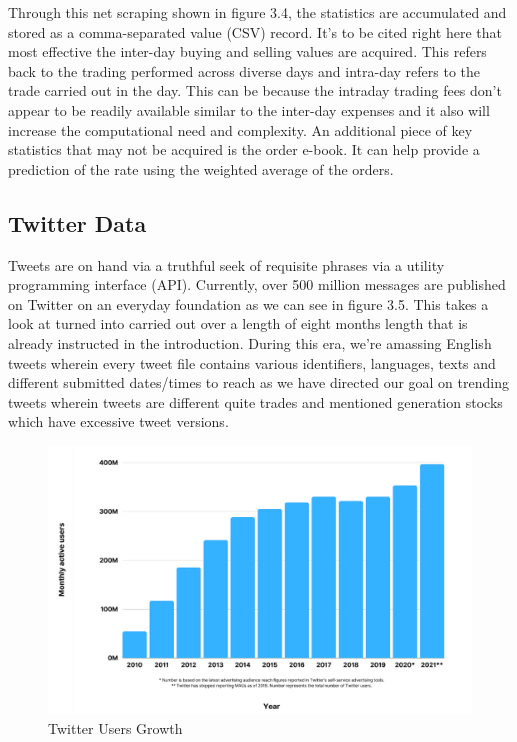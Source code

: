 Through this net scraping shown in figure 3.4, the statistics are accumulated and stored as a comma-separated value (CSV) record. It’s to be cited right here that most effective the inter-day buying and selling values are acquired. This refers back to the trading performed across diverse days and intra-day refers to the trade carried out in the day. This can be because the intraday trading fees don’t appear to be readily available similar to the inter-day expenses and it also will increase the computational need and complexity. An additional piece of key statistics that may not be acquired is the order e-book. It can help provide a prediction of the rate using the weighted average of the orders.\\



\subsection{Twitter Data}
Tweets are on hand via a truthful seek of requisite phrases via a utility programming interface (API). Currently, over 500 million messages are published on Twitter on an everyday foundation as we can see in figure 3.5. This takes a look at turned into carried out over a length of eight months length that is already instructed in the introduction. During this era, we’re amassing English tweets wherein every tweet file contains various identifiers, languages, texts and different submitted dates/times to reach as we have directed our goal on trending tweets wherein tweets are different quite trades and mentioned generation stocks which have excessive tweet versions. \cite{bhardwaj2015sentiment}\\
\begin{figure}[H]
    \centering
    \includegraphics[scale=.5]{img3/Twitter Users.png}
    \caption{Twitter Users Growth}
    \label{fig:Twitter Users}
\end{figure}

